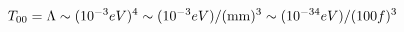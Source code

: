 \begin{equation}
T_{00} = \Lambda \sim (10^{-3} eV)^4 
\sim (10^{-3} eV)/ ({\rm mm})^{3} \sim (10^{-34} eV)/(100f)^3
\label{Lambda}
\end{equation}

